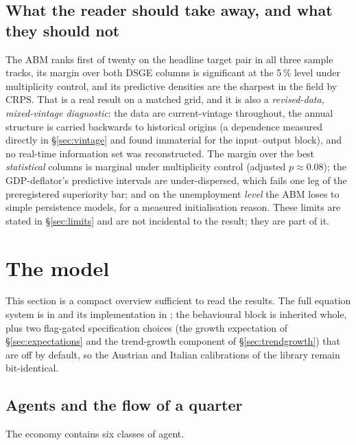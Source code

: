 \documentclass[11pt,a4paper]{article}
\begin{document}
\subsection{What the reader should take away, and what they should not}

The ABM ranks first of twenty on the headline target pair in all three sample tracks, its margin
over both DSGE columns is significant at the 5\,\% level under multiplicity control, and its
predictive densities are the sharpest in the field by CRPS. That is a real result on a matched
grid, and it is also a \emph{revised-data, mixed-vintage diagnostic}: the data are current-vintage
throughout, the annual structure is carried backwards to historical origins (a dependence measured
directly in \S\ref{sec:vintage} and found immaterial for the input--output block), and no
real-time information set was reconstructed. The margin over the best \emph{statistical} columns
is marginal under multiplicity control (adjusted $p \approx 0.08$); the GDP-deflator's predictive
intervals are under-dispersed, which fails one leg of the preregistered superiority bar; and on
the unemployment \emph{level} the ABM loses to simple persistence models, for a measured
initialisation reason. These limits are stated in \S\ref{sec:limits} and are not incidental to the
result; they are part of it.

\section{The model}
\label{sec:model}

This section is a compact overview sufficient to read the results. The full equation system is in
\citet{poledna2023} and its implementation in \citet{beforeit2025}; the behavioural block is
inherited whole, plus two flag-gated specification choices (the growth expectation of
\S\ref{sec:expectations} and the trend-growth component of \S\ref{sec:trendgrowth}) that are off
by default, so the Austrian and Italian calibrations of the library remain bit-identical.

\subsection{Agents and the flow of a quarter}

The economy contains six classes of agent.
\end{document}
